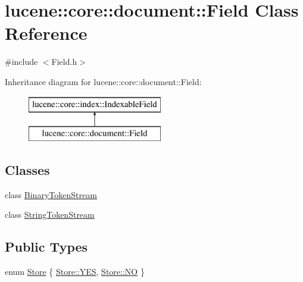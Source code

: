 \hypertarget{classlucene_1_1core_1_1document_1_1Field}{}\section{lucene\+:\+:core\+:\+:document\+:\+:Field Class Reference}
\label{classlucene_1_1core_1_1document_1_1Field}


{\ttfamily \#include $<$Field.\+h$>$}

Inheritance diagram for lucene\+:\+:core\+:\+:document\+:\+:Field\+:\begin{figure}[H]
\begin{center}
\leavevmode
\includegraphics[height=2.000000cm]{classlucene_1_1core_1_1document_1_1Field}
\end{center}
\end{figure}
\subsection*{Classes}
\begin{DoxyCompactItemize}
\item 
class \mbox{\hyperlink{classlucene_1_1core_1_1document_1_1Field_1_1BinaryTokenStream}{Binary\+Token\+Stream}}
\item 
class \mbox{\hyperlink{classlucene_1_1core_1_1document_1_1Field_1_1StringTokenStream}{String\+Token\+Stream}}
\end{DoxyCompactItemize}
\subsection*{Public Types}
\begin{DoxyCompactItemize}
\item 
enum \mbox{\hyperlink{classlucene_1_1core_1_1document_1_1Field_a7d5d79f0c56d3548ab8d46d0e7dae35d}{Store}} \{ \mbox{\hyperlink{classlucene_1_1core_1_1document_1_1Field_a7d5d79f0c56d3548ab8d46d0e7dae35da7469a286259799e5b37e5db9296f00b3}{Store\+::\+Y\+ES}}, 
\mbox{\hyperlink{classlucene_1_1core_1_1document_1_1Field_a7d5d79f0c56d3548ab8d46d0e7dae35dac2f3f489a00553e7a01d369c103c7251}{Store\+::\+NO}}
 \}
\end{DoxyCompactItemize}
